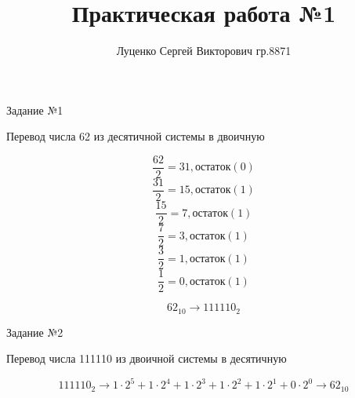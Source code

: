 \documentclass[a4paper,11pt]{article}
\title{Практическая работа №1}
\author{Луценко Сергей Викторович гр.8871}
\begin{document}
 
\maketitle 

Задание №1 

Перевод числа 62 из десятичной системы в двоичную 

$$\frac{62}{2}=31,остаток (0)$$ 
$$\frac{31}{2}=15,остаток (1)$$ 
$$\frac{15}{2}=7,остаток (1)$$ 
$$\frac{7}{2}=3,остаток (1)$$ 
$$\frac{3}{2}=1,остаток (1)$$ 
$$\frac{1}{2}=0,остаток (1)$$ 


$$62_{10}\rightarrow 111110_{2}$$ 

Задание №2 

Перевод числа 111110 из двоичной системы в десятичную 

$$111110_{2}\rightarrow 1\cdot 2^{5}+1\cdot 2^{4}+1\cdot 2^{3}+1\cdot 2^{2}+1\cdot 2^{1}+0\cdot 2^{0}\rightarrow 62_{10}$$ 
\end{document}
